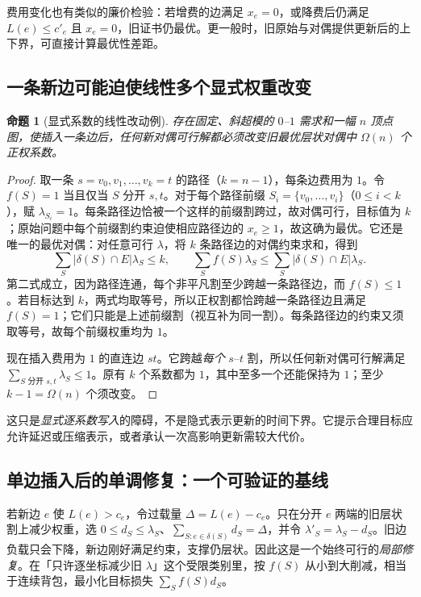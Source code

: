 \documentclass[UTF8,10pt,a4paper]{ctexart}
\newtheorem{proposition}{命题}[section]
\newcommand{\cut}{\delta}
\begin{document}
费用变化也有类似的廉价检验：若增费的边满足 $x_e=0$，或降费后仍满足 $L(e)\le c'_e$ 且 $x_e=0$，旧证书仍最优。更一般时，旧原始与对偶提供更新后的上下界，可直接计算最优性差距。

\subsection{一条新边可能迫使线性多个显式权重改变}

\begin{proposition}[显式系数的线性改动例]
存在固定、斜超模的 $0$--$1$ 需求和一幅 $n$ 顶点图，使插入\emph{一条}边后，任何新对偶可行解都必须改变旧最优层状对偶中 $\Omega(n)$ 个正权系数。
\end{proposition}
\begin{proof}
取一条 $s=v_0,v_1,\ldots,v_k=t$ 的路径（$k=n-1$），每条边费用为 $1$。令 $f(S)=1$ 当且仅当 $S$ 分开 $s,t$。对于每个路径前缀 $S_i=\{v_0,\ldots,v_i\}$（$0\le i<k$），赋 $\lambda_{S_i}=1$。每条路径边恰被一个这样的前缀割跨过，故对偶可行，目标值为 $k$；原始问题中每个前缀割约束迫使相应路径边的 $x_e\ge1$，故这确为最优。它还是唯一的最优对偶：对任意可行 $\lambda$，将 $k$ 条路径边的对偶约束求和，得到
\[
\sum_S |\cut(S)\cap E|\lambda_S\le k,
\qquad
\sum_S f(S)\lambda_S\le\sum_S |\cut(S)\cap E|\lambda_S.
\]
第二式成立，因为路径连通，每个非平凡割至少跨越一条路径边，而 $f(S)\le1$。若目标达到 $k$，两式均取等号，所以正权割都恰跨越一条路径边且满足 $f(S)=1$；它们只能是上述前缀割（视互补为同一割）。每条路径边的约束又须取等号，故每个前缀权重均为 $1$。

现在插入费用为 $1$ 的直连边 $st$。它跨越\emph{每个} $s$--$t$ 割，所以任何新对偶可行解满足 $\sum_{S\text{ 分开 }s,t}\lambda_S\le1$。原有 $k$ 个系数都为 $1$，其中至多一个还能保持为 $1$；至少 $k-1=\Omega(n)$ 个须改变。
\end{proof}

这只是\emph{显式逐系数写入}的障碍，不是隐式表示更新的时间下界。它提示合理目标应允许延迟或压缩表示，或者承认一次高影响更新需较大代价。

\subsection{单边插入后的单调修复：一个可验证的基线}

若新边 $e$ 使 $L(e)>c_e$，令过载量 $\Delta=L(e)-c_e$。只在分开 $e$ 两端的旧层状割上减少权重，选 $0\le d_S\le\lambda_S$、$\sum_{S:e\in\cut(S)}d_S=\Delta$，并令 $\lambda'_S=\lambda_S-d_S$。旧边负载只会下降，新边刚好满足约束，支撑仍层状。因此这是一个始终可行的\emph{局部修复}。在「只许逐坐标减少旧 $\lambda$」这个受限类别里，按 $f(S)$ 从小到大削减，相当于连续背包，最小化目标损失 $\sum_S f(S)d_S$。
\end{document}
